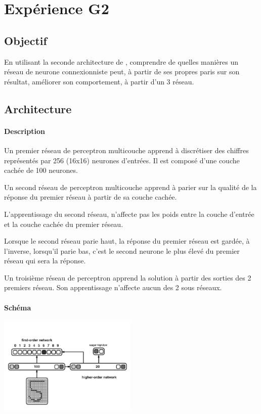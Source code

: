 \section{Expérience G2} \label{expG2}
  \subsection{Objectif}
    En utilisant la seconde architecture de \cite{Cleeremans_2007}, 
    comprendre de quelles manières un réseau de neurone connexionniste peut, à partir de ses propres paris
    sur son résultat, améliorer son comportement, à partir d'un 3 réseau.
  
  
     
  \subsection{Architecture}
    \paragraph{Description}
      Un premier réseau de perceptron multicouche apprend à discrétiser des chiffres représentés
      par 256 (16x16) neurones d'entrées. Il est composé d'une couche cachée de 100 neurones.
      
      Un second réseau de perceptron multicouche apprend à parier sur la qualité de la réponse
      du premier réseau à partir de sa couche cachée.
      
      L'apprentissage du second réseau, n'affecte pas les poids entre la couche d'entrée et la 
      couche cachée du premier réseau.
      
      Lorsque le second réseau parie haut, la réponse du premier réseau est gardée, à l'inverse,
      lorsqu'il parie bas, c'est le second neurone le plus élevé du premier réseau qui sera 
      la réponse.
      
      Un troisième réseau de perceptron apprend la solution à partir des sorties des 2 premiers 
      réseau. Son apprentissage n'affecte aucun des 2 sous réseaux.


    \paragraph{Schéma}
      \begin{center}
	\includegraphics[width=250px]{data/expG2/schema.png}
      \end{center}
      

